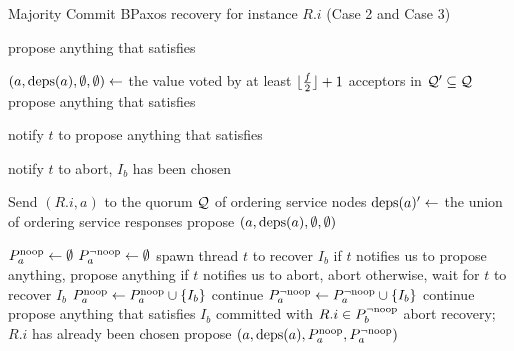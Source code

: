 \begin{algorithm}[t!]
  \caption{Majority Commit BPaxos recovery for instance $R.i$ (Case 2 and Case 3)}%
  \begin{algorithmic}[1]
      \State propose anything that satisfies 
    \EndIf{}

    \State
    \State {}
      $(a, \text{deps}(a), \emptyset, \emptyset) \gets$ the value voted by at least
      $\lfloor\frac{f}{2}\rfloor + 1$ acceptors in $\mathcal{Q}' \subseteq \mathcal{Q}$
      \State propose anything that satisfies 
    \EndIf{}

      \State notify $t$ to propose anything that satisfies
    \EndIf{}

      \State notify $t$ to abort, $I_b$ has been chosen
    \EndIf{}
    \State {}

    \State Send $(R.i, a)$ to the quorum $\mathcal{Q}$ of ordering service nodes
    \State $\text{deps}(a)' \gets$ the union of ordering service responses
      \State propose $(a, \text{deps}(a), \emptyset, \emptyset)$
    \EndIf{}

    \State
    \State $P^{\text{noop}}_{a} \gets \emptyset$
    \State $P^{\lnot \text{noop}}_{a} \gets \emptyset$
        \State {} spawn thread $t$ to recover $I_b$
        \State if $t$ notifies us to propose anything, propose anything
        \State if $t$ notifies us to abort, abort
        \State otherwise, wait for $t$ to recover $I_b$
      \EndIf
        \State $P^{\text{noop}}_{a} \gets P^{\text{noop}}_{a} \cup \{I_b\}$
        \State continue
      \EndIf{}
        \State $P^{\lnot \text{noop}}_{a} \gets P^{\lnot \text{noop}}_{a} \cup \{I_b\}$
        \State continue
        \State propose anything that satisfies 
      \Else{}
        \State $I_b$ committed with $R.i \in P^{\lnot \text{noop}}_{b}$
        \State abort recovery; $R.i$ has already been chosen
      \EndIf{}
    \EndFor{}
    \State propose $(a, \text{deps}(a), P^{\text{noop}}_{a}, P^{\lnot \text{noop}}_{a})$
  \end{algorithmic}
\end{algorithm}

